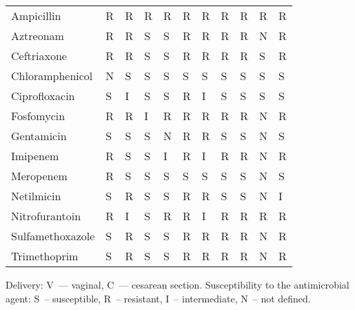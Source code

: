 \begin{table}
\begin{threeparttable}
\begin{tabularx}{\textwidth}{lllllllllll}
                         Ampicillin &           R &           R &           R &           R &      R &      R &      R &      R &      R &      R \\
                          Aztreonam &           R &           R &           S &           S &      R &      R &      R &      R &      N &      R \\
                        Ceftriaxone &           R &           R &           S &           S &      R &      R &      R &      R &      S &      R \\
                    Chloramphenicol &           N &           S &           S &           S &      S &      S &      S &      S &      S &      S \\
                      Ciprofloxacin &           S &           I &           S &           S &      R &      I &      S &      S &      S &      S \\
                         Fosfomycin &           R &           R &           I &           R &      R &      R &      R &      R &      N &      R \\
                         Gentamicin &           S &           S &           S &           N &      R &      R &      S &      S &      N &      S \\
                           Imipenem &           R &           S &           S &           I &      R &      I &      R &      R &      N &      R \\
                          Meropenem &           R &           S &           S &           S &      S &      S &      S &      S &      N &      S \\
                         Netilmicin &           S &           R &           S &           S &      R &      R &      S &      S &      N &      I \\
                     Nitrofurantoin &           R &           I &           S &           R &      R &      I &      R &      R &      R &      R \\
                   Sulfamethoxazole &           S &           R &           S &           S &      R &      R &      R &      R &      N &      R \\
                       Trimethoprim &           S &           R &           S &           S &      R &      R &      R &      R &      N &      R \\
\bottomrule
\end{tabularx}

\begin{tablenotes}
\item
Delivery: V~--- vaginal, C~--- cesarean section.
Susceptibility to the antimicrobial agent: S~-- susceptible, R~-- resistant, I~-- intermediate, N~-- not defined.
\end{tablenotes}
\end{threeparttable}
\end{table}
